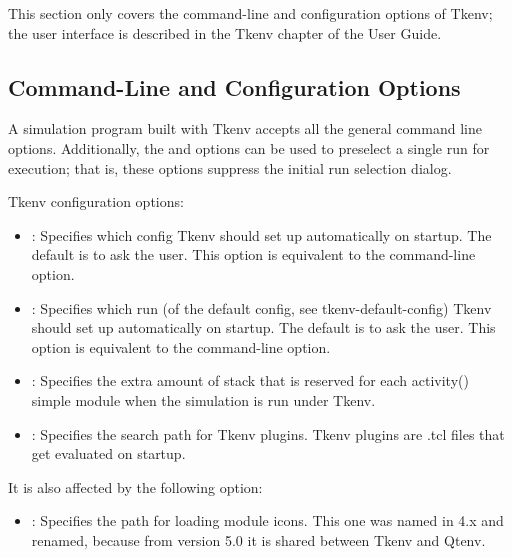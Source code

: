 \begin{note}
  This section only covers the command-line and configuration options
  of Tkenv; the user interface is described in the Tkenv chapter of the
  {\opp} User Guide.
\end{note}

\subsection{Command-Line and Configuration Options}
\label{sec:run-sim:tkenv-options}

A simulation program built with Tkenv accepts all the general command line
options.  Additionally, the 
and  options can be used to preselect a single run for execution;
that is, these options suppress the initial run selection dialog.

Tkenv configuration options:

\begin{itemize}
  \item {}:
    Specifies which config Tkenv should set up automatically on startup. The
    default is to ask the user. This option is equivalent to the 
    command-line option.

  \item {}: Specifies which run (of the default
    config, see tkenv-default-config) Tkenv should set up automatically on startup.
    The default is to ask the user. This option is equivalent to the 
    command-line option.

  \item {}:
    Specifies the extra amount of stack that is reserved for each activity()
    simple module when the simulation is run under Tkenv.

  \item {}:
    Specifies the search path for Tkenv plugins. Tkenv plugins are .tcl files
    that get evaluated on startup.
\end{itemize}

It is also affected by the following option:

\begin{itemize}
  \item {}: Specifies the path for loading module icons.
    This one was named  in {\opp} 4.x and renamed,
    because from version 5.0 it is shared between Tkenv and Qtenv.
\end{itemize}


